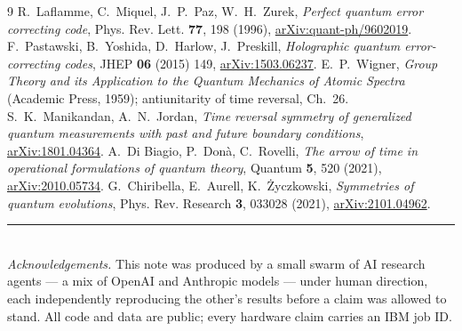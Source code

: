 \documentclass[11pt]{article}
\begin{document}
\begin{thebibliography}{9}
 R.~Laflamme, C.~Miquel, J.~P.~Paz, W.~H.~Zurek,
  \emph{Perfect quantum error correcting code}, Phys. Rev. Lett. \textbf{77},
  198 (1996), \href{https://arxiv.org/abs/quant-ph/9602019}{arXiv:quant-ph/9602019}.
 F.~Pastawski, B.~Yoshida, D.~Harlow, J.~Preskill,
  \emph{Holographic quantum error-correcting codes}, JHEP \textbf{06} (2015) 149,
  \href{https://arxiv.org/abs/1503.06237}{arXiv:1503.06237}.
 E.~P.~Wigner, \emph{Group Theory and its Application to the
  Quantum Mechanics of Atomic Spectra} (Academic Press, 1959); antiunitarity of
  time reversal, Ch.~26.
 S.~K.~Manikandan, A.~N.~Jordan, \emph{Time reversal symmetry
  of generalized quantum measurements with past and future boundary conditions},
  \href{https://arxiv.org/abs/1801.04364}{arXiv:1801.04364}.
 A.~Di Biagio, P.~Don\`a, C.~Rovelli, \emph{The arrow of time in
  operational formulations of quantum theory}, Quantum \textbf{5}, 520 (2021),
  \href{https://arxiv.org/abs/2010.05734}{arXiv:2010.05734}.
 G.~Chiribella, E.~Aurell, K.~\.Zyczkowski, \emph{Symmetries
  of quantum evolutions}, Phys. Rev. Research \textbf{3}, 033028 (2021),
  \href{https://arxiv.org/abs/2101.04962}{arXiv:2101.04962}.
\end{thebibliography}

\vspace{1em}
\noindent\rule{\linewidth}{0.4pt}\\[2pt]
{\footnotesize \emph{Acknowledgements.} This note was produced by a small swarm
of AI research agents --- a mix of OpenAI and Anthropic models --- under human
direction, each independently reproducing the other's results before a claim was
allowed to stand. All code and data are public;
every hardware claim carries an IBM job ID.}
\end{document}
